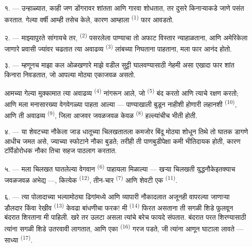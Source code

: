 \VUsaut{4.0mm}
\VUsaut{3.0mm}
\VUsaut{3.0mm}

१. --- उन्हाळ्यात, काही जण डोंगरावर शांतता आणि गारवा शोधतात, तर दुसरे किनाऱ्याकडे जाणे पसंत
करतात. गेल्या वर्षी आम्ही तसेच केले, कारण आम्हाला  \textsuperscript{(1)} फार
आवडतो.

२. --- माझ्यापुरते सांगायचे तर,  \textsuperscript{(2)} पसरलेला पाण्याचा
तो अफाट विस्तार न्याहाळताना, आणि अमेरिकेला जाणारे प्रवासी ज्यांवर चढतात त्या अवाढव्य
 \textsuperscript{(3)} लांबच्या  निघताना पाहताना, मला फार
आनंद होतो.

३. --- म्हणूनच माझा कल ओळखणारे माझे वडील सुट्टी घालवण्यासाठी नेहमी असा एखादा फार शांत किनारा
निवडतात, जो आपल्या मोठ्या  एकाजवळ असतो.

आमच्या गेल्या मुक्कामात  त्या अवाढव्य 
\textsuperscript{(4)} नांगरून आले, जो  \textsuperscript{(5)} बंद करतो आणि
त्याचे रक्षण करतो; आणि मला मनासारख्या वेगवेगळ्या  पाहता आल्या — पाण्याखाली
बुडून नाहीशी होणारी लहानशी  \textsuperscript{(10)}, आणि ती अवाढव्य
 \textsuperscript{(9)}, जिला आजवर जवळजवळ केवळ
 \textsuperscript{(8)} हल्ल्यांचीच भीती होती.

\VUsaut{3.0mm}
\VUsaut{3.0mm}

४. --- या शेवटच्या नौकेला जाड धातूच्या चिलखतातला कमजोर बिंदू मोठ्या  शोधून
तिथे तो घातक  डागणे आधीच जमत असे, ज्याच्या स्फोटाने नौका बुडते; तरीही ती
पाणबुडीपेक्षा कमी भीतिदायक होती, कारण टॉर्पेडोरोधक नौका तिचा सहज पाठलाग करतात.

५. --- मला चिलखत घातलेल्या वेगवान  \textsuperscript{(6)} पाहायला मिळाल्या
— खऱ्या चिलखती युद्धनौकेइतक्याच जवळजवळ अभेद्य —, कित्येक 
\textsuperscript{(12)}, तीन-चार  \textsuperscript{(7)} आणि शेवटी एक
 \textsuperscript{(11)}.

६. --- त्या पोलादाच्या भल्यामोठ्या ढिगांमध्ये आणि व्यापारी नौकादलात अजूनही वापरल्या जाणाऱ्या
डौलदार  किंवा रेखीव 
\textsuperscript{(13)} केवढा बांधणीचा फरक! मी  \textsuperscript{(14)} फिरत
असताना ती सगळी शिडे फुलवून बंदरात शिरताना मी पाहिली. खरे तर  उलटा असला
 त्यांचे बरेच फायदे संपतात. बंदरात परत शिरण्यासाठी त्यांना सगळी शिडे उतरवावी
लागतात, आणि एका  \textsuperscript{(16)} गरज पडते, जी त्यांना आणून घाटाला
लावते — साध्या  \textsuperscript{(17)}.

